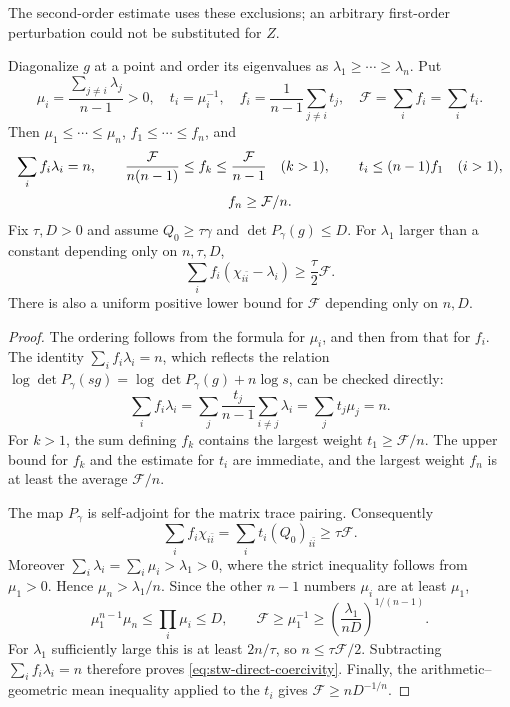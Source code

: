 The second-order estimate uses these exclusions; an arbitrary first-order perturbation could not be substituted for $Z$.

\begin{lemma}\label{lem:stw-logdet-coercivity}
Diagonalize $g$ at a point and order its eigenvalues as $\lambda_1\geq\cdots\geq\lambda_n$. Put
\[
 \mu_i=\frac{\sum_{j\ne i}\lambda_j}{n-1}>0,
 \quad t_i=\mu_i^{-1},\quad
 f_i=\frac1{n-1}\sum_{j\ne i}t_j,
 \quad \mathcal F=\sum_i f_i=\sum_i t_i.
\]
Then $\mu_1\leq\cdots\leq\mu_n$, $f_1\leq\cdots\leq f_n$, and
\begin{gather}
 \sum_i f_i\lambda_i=n,\qquad
 \frac{\mathcal F}{n(n-1)}\leq f_k\leq\frac{\mathcal F}{n-1}
       \quad(k>1),\qquad t_i\leq(n-1)f_1\quad(i>1),
 \label{eq:stw-weight-comparability}\\
 f_n\geq\mathcal F/n.
 \notag
\end{gather}
Fix $\tau,D>0$ and assume $Q_0\geq\tau\gamma$ and $\det P_\gamma(g)\leq D$. For $\lambda_1$ larger than a constant depending only on $n,\tau,D$,
\begin{equation}\label{eq:stw-direct-coercivity}
 \sum_i f_i(\chi_{i\bar i}-\lambda_i)
                \geq\frac\tau2\mathcal F.
\end{equation}
There is also a uniform positive lower bound for $\mathcal F$ depending only on $n,D$.
\end{lemma}
\begin{proof}
The ordering follows from the formula for $\mu_i$, and then from that for $f_i$. The identity $\sum_if_i\lambda_i=n$, which reflects the relation $\log\det P_\gamma(sg)=\log\det P_\gamma(g)+n\log s$, can be checked directly:
\[
 \sum_i f_i\lambda_i
   =\sum_j\frac{t_j}{n-1}\sum_{i\ne j}\lambda_i
   =\sum_jt_j\mu_j=n.
\]
For $k>1$, the sum defining $f_k$ contains the largest weight $t_1\geq\mathcal F/n$. The upper bound for $f_k$ and the estimate for $t_i$ are immediate, and the largest weight $f_n$ is at least the average $\mathcal F/n$.

The map $P_\gamma$ is self-adjoint for the matrix trace pairing. Consequently
\[
 \sum_i f_i\chi_{i\bar i}
   =\sum_i t_i(Q_0)_{i\bar i}\geq\tau\mathcal F.
\]
Moreover $\sum_i\lambda_i=\sum_i\mu_i>\lambda_1>0$, where the strict inequality follows from $\mu_1>0$. Hence $\mu_n>\lambda_1/n$. Since the other $n-1$ numbers $\mu_i$ are at least $\mu_1$,
\[
 \mu_1^{n-1}\mu_n\leq\prod_i\mu_i\leq D,
 \qquad
 \mathcal F\geq\mu_1^{-1}
             \geq\left(\frac{\lambda_1}{nD}\right)^{1/(n-1)}.
\]
For $\lambda_1$ sufficiently large this is at least $2n/\tau$, so $n\leq\tau\mathcal F/2$. Subtracting $\sum_i f_i\lambda_i=n$ therefore proves \eqref{eq:stw-direct-coercivity}. Finally, the arithmetic--geometric mean inequality applied to the $t_i$ gives $\mathcal F\geq nD^{-1/n}$.
\end{proof}

